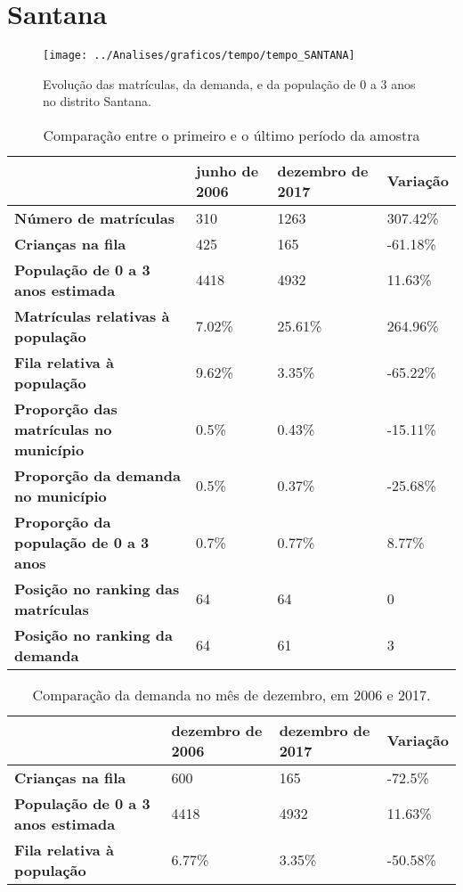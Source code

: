 \section{Santana}
\begin{figure}[H]
\centering
\texttt{[image: ../Analises/graficos/tempo/tempo\_SANTANA]}
\caption{Evolução das matrículas, da demanda, e da população de 0 a 3 anos no distrito Santana.}
\end{figure}
\begin{table}[H]
\begin{tabular}{|l|l|l|l|}
\hline
\textbf{}                                      & \textbf{junho de 2006}       & \textbf{dezembro de 2017}    & \textbf{Variação} \\ \hline
\textbf{Número de matrículas}                  & 310 & 1263 & 307.42\% \\ \hline
\textbf{Crianças na fila}                      & 425 & 165 & -61.18\% \\ \hline
\textbf{População de 0 a 3 anos estimada}      & 4418 & 4932 & 11.63\% \\ \hline
\textbf{Matrículas relativas à população}      & 7.02\% & 25.61\% & 264.96\% \\ \hline
\textbf{Fila relativa à população}             & 9.62\% & 3.35\% & -65.22\% \\ \hline
\textbf{Proporção das matrículas no município} & 0.5\% & 0.43\% & -15.11\% \\ \hline
\textbf{Proporção da demanda no município}     & 0.5\% & 0.37\% & -25.68\% \\ \hline
\textbf{Proporção da população de 0 a 3 anos}  & 0.7\% & 0.77\% & 8.77\% \\ \hline
\textbf{Posição no ranking das matrículas}     & 64 & 64 & 0 \\ \hline
\textbf{Posição no ranking da demanda}         & 64 & 61 & 3 \\ \hline
\end{tabular}
\caption{Comparação entre o primeiro e o último período da amostra}
\end{table}
\begin{table}[H]
\begin{tabular}{|l|l|l|l|}
\hline
\textbf{}                                 & \textbf{dezembro de 2006} & \textbf{dezembro de 2017} & \textbf{Variação} \\ \hline
\textbf{Crianças na fila}                      & 600 & 165 & -72.5\% \\ \hline
\textbf{População de 0 a 3 anos estimada}      & 4418 & 4932 & 11.63\% \\ \hline
\textbf{Fila relativa à população}             & 6.77\% & 3.35\% & -50.58\% \\ \hline
\end{tabular}
\caption{Comparação da demanda no mês de dezembro, em 2006 e 2017.}
\end{table}
